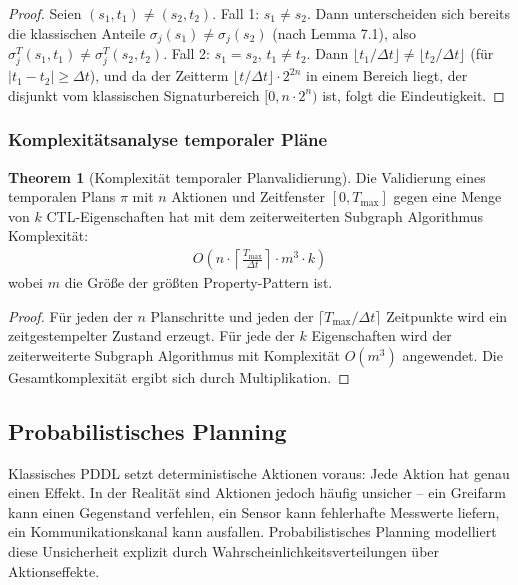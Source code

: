 ﻿\documentclass[a4paper,12pt]{article}
\theoremstyle{definition}
\newtheorem{theorem}{Theorem}[section]
\begin{document}
\begin{proof}
Seien $(s_1, t_1) \neq (s_2, t_2)$. Fall 1: $s_1 \neq s_2$. Dann unterscheiden sich bereits die klassischen Anteile $\sigma_j(s_1) \neq \sigma_j(s_2)$ (nach Lemma 7.1), also $\sigma_j^T(s_1, t_1) \neq \sigma_j^T(s_2, t_2)$. Fall 2: $s_1 = s_2$, $t_1 \neq t_2$. Dann $\lfloor t_1/\Delta t\rfloor \neq \lfloor t_2/\Delta t\rfloor$ (für $|t_1 - t_2| \geq \Delta t$), und da der Zeitterm $\lfloor t/\Delta t\rfloor \cdot 2^{2n}$ in einem Bereich liegt, der disjunkt vom klassischen Signaturbereich $[0, n \cdot 2^n)$ ist, folgt die Eindeutigkeit.
\end{proof}

\subsubsection{Komplexitätsanalyse temporaler Pläne}

\begin{theorem}[Komplexität temporaler Planvalidierung]
Die Validierung eines temporalen Plans $\pi$ mit $n$ Aktionen und Zeitfenster $[0, T_{\max}]$ gegen eine Menge von $k$ CTL-Eigenschaften hat mit dem zeiterweiterten Subgraph Algorithmus Komplexität:
\begin{align}
  O\!\left(n \cdot \left\lceil \frac{T_{\max}}{\Delta t} \right\rceil \cdot m^3 \cdot k\right)
\end{align}
wobei $m$ die Größe der größten Property-Pattern ist.
\end{theorem}

\begin{proof}
Für jeden der $n$ Planschritte und jeden der $\lceil T_{\max}/\Delta t \rceil$ Zeitpunkte wird ein zeitgestempelter Zustand erzeugt. Für jede der $k$ Eigenschaften wird der zeiterweiterte Subgraph Algorithmus mit Komplexität $O(m^3)$ angewendet. Die Gesamtkomplexität ergibt sich durch Multiplikation.
\end{proof}

\subsection{Probabilistisches Planning}

Klassisches PDDL setzt deterministische Aktionen voraus: Jede Aktion hat genau einen Effekt. In der Realität sind Aktionen jedoch häufig unsicher -- ein Greifarm kann einen Gegenstand verfehlen, ein Sensor kann fehlerhafte Messwerte liefern, ein Kommunikationskanal kann ausfallen. Probabilistisches Planning modelliert diese Unsicherheit explizit durch Wahrscheinlichkeitsverteilungen über Aktionseffekte.
\end{document}
